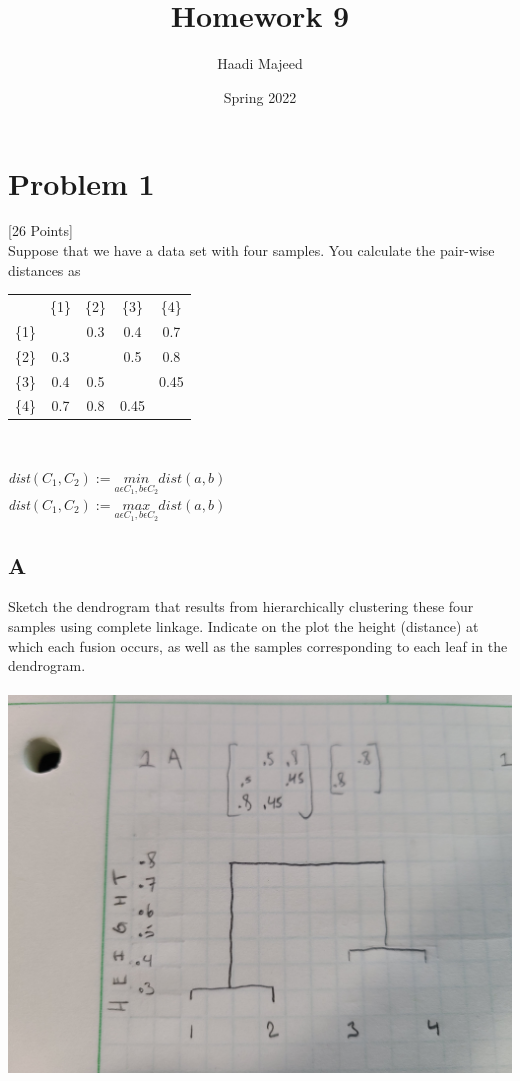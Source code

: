 \documentclass[12pt]{article}
\title{ \course \\\large Homework 9 }
\author{ Haadi Majeed }
\date{Spring 2022}
\begin{document}
\maketitle
\pagebreak

\pagebreak
\section{Problem 1}
 [26 Points]\\
Suppose that we have a data set with four samples. You calculate the pair-wise distances as\\
\begin{center}
    \begin{tabular}{c c c c c}
        {}    & \{1\} & \{2\} & \{3\} & \{4\} \\
        \{1\} &       & 0.3   & 0.4   & 0.7   \\
        \{2\} & 0.3   &       & 0.5   & 0.8   \\
        \{3\} & 0.4   & 0.5   &       & 0.45  \\
        \{4\} & 0.7   & 0.8   & 0.45  &
    \end{tabular}\\

    \vspace{.2in}


    \emph{dist}$(C_1, C_2) := \underset{a\epsilon C_1, b\epsilon C_2}{min} dist(a,b)$\\
    \emph{dist}$(C_1, C_2) := \underset{a\epsilon C_1, b\epsilon C_2}{max} dist(a,b)$
\end{center}


\subsection{A}
Sketch the dendrogram that results from hierarchically clustering these four samples using complete linkage. Indicate on the plot the height (distance) at which each fusion occurs, as well as the samples corresponding to each leaf in the dendrogram.\\\\
\includegraphics[width=1\textwidth]{p1.a.jpg}
\end{document}
